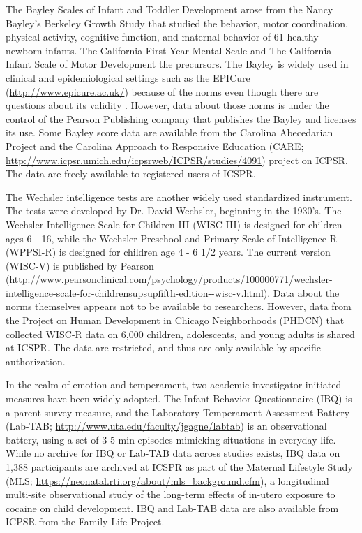 \documentclass[letterpaper,man,apacite]{apa6}
\begin{document}
The Bayley Scales of Infant and Toddler Development \cite{bayley2006bayley} arose from the Nancy Bayley's Berkeley Growth Study \cite{jones_berkeley_1941} that studied the behavior, motor coordination, physical activity, cognitive function, and maternal behavior of 61 healthy newborn infants.
The California First Year Mental Scale \cite{bayley1933california} and The California Infant Scale of Motor Development \cite{bayley1936california} the precursors.
The Bayley is widely used in clinical and epidemiological settings such as the EPICure (\url{http://www.epicure.ac.uk/}) because of the norms even though there are questions about its validity \cite{hack_poor_2005}.
However, data about those norms is under the control of the Pearson Publishing company that publishes the Bayley and licenses its use.
Some Bayley score data are available from the Carolina Abecedarian Project and the Carolina Approach to Responsive Education (CARE; \url{http://www.icpsr.umich.edu/icpsrweb/ICPSR/studies/4091}) project on ICPSR.
The data are freely available to registered users of ICSPR. 

The Wechsler intelligence tests are another widely used standardized instrument.
The tests were developed by Dr. David Wechsler, beginning in the 1930's. 
The Wechsler Intelligence Scale for Children-III (WISC-III) is designed for children ages 6 - 16, while the Wechsler Preschool and Primary Scale of Intelligence-R (WPPSI-R) is designed for children age 4 - 6 1/2 years.
The current version (WISC-V) is published by Pearson (\url{http://www.pearsonclinical.com/psychology/products/100000771/wechsler-intelligence-scale-for-childrensupsupfifth-edition--wisc-v.html}).
Data about the norms themselves appears not to be available to researchers.
However, data from the Project on Human Development in Chicago Neighborhoods (PHDCN) that collected WISC-R data on 6,000 children, adolescents, and young adults is shared at ICSPR. The data are restricted, and thus are only available by specific authorization.

In the realm of emotion and temperament, two academic-investigator-initiated measures have been widely adopted.
The Infant Behavior Questionnaire (IBQ) is a parent survey measure, and the Laboratory Temperament Assessment Battery (Lab-TAB; \url{http://www.uta.edu/faculty/jgagne/labtab}) is an observational battery, using a set of 3-5 min episodes mimicking situations in everyday life.
While no archive for IBQ or Lab-TAB data across studies exists, IBQ data on 1,388 participants are archived at ICSPR as part of the Maternal Lifestyle Study (MLS; \url{https://neonatal.rti.org/about/mls_background.cfm}), a longitudinal multi-site observational study of the long-term effects of in-utero exposure to cocaine on child development.
IBQ and Lab-TAB data are also available from ICPSR from the Family Life Project.
\end{document}
